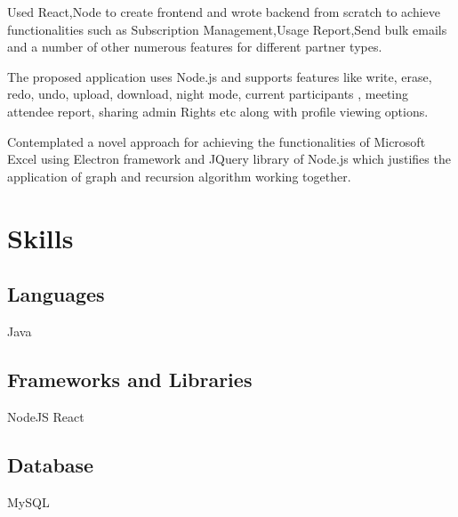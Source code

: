 \documentclass[]{deedy-resume-openfont}
\begin{document}
\begin{minipage}[t][0pt]{0.33\textwidth}
\item Used React,Node to create frontend and wrote backend from scratch to achieve functionalities such as Subscription Management,Usage Report,Send bulk emails and a number of other numerous features for different partner types.


\sectionsep
{} \hspace*{\fill}
\href{https://zoomoboard.herokuapp.com/}{\faLink} \hspace{0.2cm}
\href{https://github.com/shubhsting/ZOOMOBOARD}{\faGithub}
\descript{}
\location{}
\item The proposed application uses Node.js and supports features like write, erase, redo, undo, upload, download, night mode, current participants , meeting attendee report, sharing admin Rights etc along with profile viewing options.

\sectionsep

\hspace*{\fill}
\href{https://github.com/shubhsting/NODE_OSS_PEP/tree/master/Lec5_Excel_Electron}{\faGithub}

\descript{}
\location{}
\item Contemplated a novel approach for achieving the functionalities of Microsoft Excel using Electron framework and JQuery library of Node.js which justifies the application of graph and recursion algorithm working together.
\sectionsep

\section{Skills}
\subsection{Languages}
\textbullet{} Java 
\subsection{Frameworks and Libraries}
\textbullet{} NodeJS  
\textbullet{} React
\subsection{Database}
\textbullet{} MySQL 
\sectionsep





\end{minipage}
\end{document}
